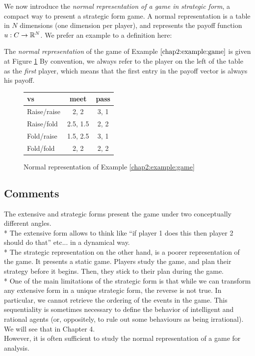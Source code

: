 We now introduce the
 \emph{normal representation of a game in strategic form}, 
a compact way to present a strategic form game. 
A normal representation is a table in $N$ dimensions
 (one dimension per player), 
 and represents the payoff function 
 $u : C \rightarrow \mathbb{R}^N$.  
 We prefer an example to a definition here:
\begin{example}
The \emph{normal representation} of the game of Example $\ref{chap2:example:game}$ is given at Figure \ref{chap2:table}
By convention, we always refer to the player on the left of the table as the \emph{first} player, 
which means that the first entry in the payoff vector is always his payoff.
\begin{figure}[!ht]
\centering
\begin{tabular}{l|cc}
\TAtwo{} vs \TAone{} & meet & pass \\
\hline
Raise/raise & 2, 2 & 3, 1 \\
Raise/fold & 2.5, 1.5 & 2, 2 \\
Fold/raise & 1.5, 2.5 & 3, 1 \\
Fold/fold & 2, 2 & 2, 2 
\end{tabular}
\caption{Normal representation of Example \ref{chap2:example:game}}
\label{chap2:table}
\end{figure}

\end{example}



\subsection{Comments}

The extensive and strategic forms present the game under two conceptually different angles.\\* 
The extensive form  allows to think like ``if player 1 does this then player 2 should do that'' etc... in a dynamical way. \\*
The strategic representation on the other hand, is a poorer representation of the game. It presents a static game. Players study the game, and plan their strategy before it begins. Then, they stick to their plan during the game.\\*
One of the main limitations of the strategic form is that while we can transform any extensive form in a unique strategic form, the reverse is not true. In particular, we cannot retrieve the ordering of the events in the game. 
This sequentiality is sometimes necessary to define the behavior of intelligent and rational agents (or, oppositely, to rule out some behaviours as being irrational).  We will see that in Chapter 4. \\
However, it is often sufficient to study the normal representation of a game for analysis. 

